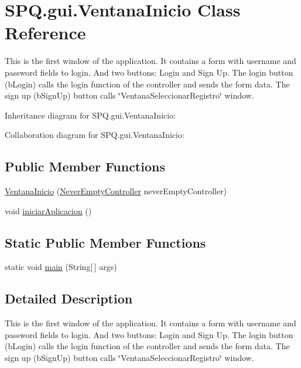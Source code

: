 \hypertarget{class_s_p_q_1_1gui_1_1_ventana_inicio}{}\section{S\+P\+Q.\+gui.\+Ventana\+Inicio Class Reference}
\label{class_s_p_q_1_1gui_1_1_ventana_inicio}


This is the first window of the application. It contains a form with username and password fields to login. And two buttons\+: Login and Sign Up. The login button (b\+Login) calls the login function of the controller and sends the form data. The sign up (b\+Sign\+Up) button calls \char`\"{}\+Ventana\+Seleccionar\+Registro\char`\"{} window.  




Inheritance diagram for S\+P\+Q.\+gui.\+Ventana\+Inicio\+:


Collaboration diagram for S\+P\+Q.\+gui.\+Ventana\+Inicio\+:
\subsection*{Public Member Functions}
\begin{DoxyCompactItemize}
\item 
\mbox{\hyperlink{class_s_p_q_1_1gui_1_1_ventana_inicio_ab74166cbe23810e4b8586849fb86b54e}{Ventana\+Inicio}} (\mbox{\hyperlink{class_s_p_q_1_1controller_1_1_never_empty_controller}{Never\+Empty\+Controller}} never\+Empty\+Controller)
\item 
void \mbox{\hyperlink{class_s_p_q_1_1gui_1_1_ventana_inicio_a0588d157580852e153c5dd2291645173}{iniciar\+Aplicacion}} ()
\end{DoxyCompactItemize}
\subsection*{Static Public Member Functions}
\begin{DoxyCompactItemize}
\item 
static void \mbox{\hyperlink{class_s_p_q_1_1gui_1_1_ventana_inicio_ab33d2c349f8f7475d2d6833e9bf75e76}{main}} (String\mbox{[}$\,$\mbox{]} args)
\end{DoxyCompactItemize}


\subsection{Detailed Description}
This is the first window of the application. It contains a form with username and password fields to login. And two buttons\+: Login and Sign Up. The login button (b\+Login) calls the login function of the controller and sends the form data. The sign up (b\+Sign\+Up) button calls \char`\"{}\+Ventana\+Seleccionar\+Registro\char`\"{} window. 

